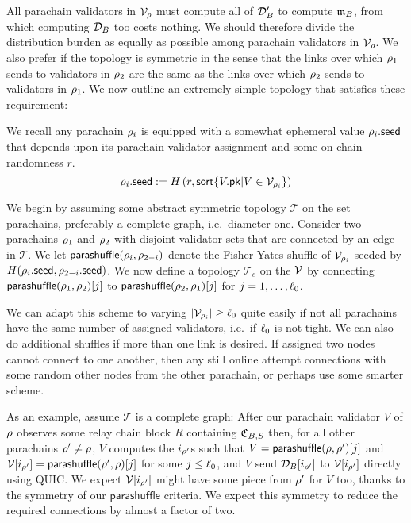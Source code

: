 All parachain validators in $\mathcal{V}_{\rho}$ must compute all of $\mathcal{D}'_B$ to compute $\mathfrak{m}_B$, from which computing $\mathcal{D}_B$ too costs nothing.  We should therefore divide the distribution burden as equally as possible among parachain validators in $\mathcal{V}_{\rho}$.  We also prefer if the topology is symmetric in the sense that the links over which $\rho_1$ sends to validators in $\rho_2$ are the same as the links over which $\rho_2$ sends to validators in $\rho_1$.  We now outline an extremely simple topology that satisfies these requirement:

We recall any parachain $\rho_i$ is equipped with a somewhat ephemeral value $\rho_i.\mathsf{seed}$ that depends upon its parachain validator assignment and some on-chain randomness $r$.
$$ \rho_i.\mathsf{seed} := H\left( r, \mathsf{sort} \{  V.\mathsf{pk}  |  V \in \mathcal{V}_{\rho_i}  \} \right) $$

We begin by assuming some abstract symmetric topology $\mathcal{T}$ on the set parachains, preferably a complete graph, i.e.\ diameter one.  Consider two parachains $\rho_1$ and $\rho_2$ with disjoint validator sets that are connected by an edge in $\mathcal{T}$.  We let $\mathsf{parashuffle}(\rho_i,\rho_{2-i})$ denote the Fisher-Yates shuffle of $\mathcal{V}_{\rho_i}$ seeded by $H( \rho_i.\mathsf{seed}, \rho_{2-i}.\mathsf{seed} )$.  We now define a topology $\mathcal{T}_e$ on the $\mathcal{V}$ by connecting $\mathsf{parashuffle}(\rho_1,\rho_2)[j]$ to $\mathsf{parashuffle}(\rho_2,\rho_1)[j]$ for $j = 1,\ldots,\ell_0$.

We can adapt this scheme to varying $|\mathcal{V}_{\rho_i}| \ge \ell_0$ quite easily if not all parachains have the same number of assigned validators, i.e.\ if $\ell_0$ is not tight.  We can also do additional shuffles if more than one link is desired.  
% 
If assigned two nodes cannot connect to one another, then any still online attempt connections with some random other nodes from the other parachain, or perhaps use some smarter scheme. 

As an example, assume $\mathcal{T}$ is a complete graph:  After our parachain validator $V$ of $\rho$ observes some relay chain block $R$ containing $\mathfrak{C}_{B,S}$ then, for all other parachains $\rho' \ne \rho$, $V$ computes the $i_{\rho'}$s such that $V = \mathsf{parashuffle}(\rho,\rho')[j]$ and $\mathcal{V}[i_{\rho'}] = \mathsf{parashuffle}(\rho',\rho)[j]$ for some $j \leq \ell_0$, and $V$ send $\mathcal{D}_B[i_{\rho'}]$ to $\mathcal{V}[i_{\rho'}]$ directly using QUIC.  We expect $\mathcal{V}[i_{\rho'}]$ might have some piece from $\rho'$ for $V$ too, thanks to the symmetry of our $\mathsf{parashuffle}$ criteria.  We expect this symmetry to reduce the required connections by almost a factor of two.

